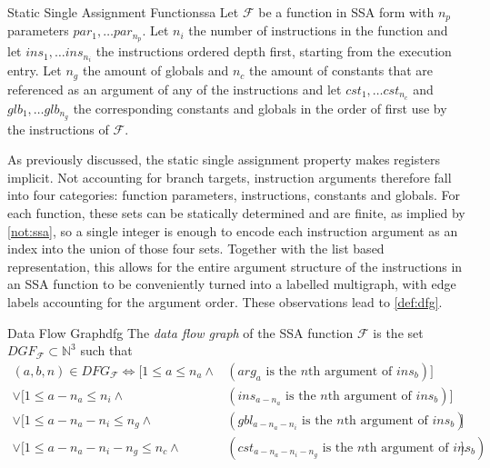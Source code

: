 \begin{notation}{Static Single Assignment Function}{ssa}
    Let $\mathcal F$ be a function in SSA form with $n_p$ parameters
    $par_1,\dots par_{n_p}$.
    Let $n_i$ the number of instructions in the function and let
    $ins_1,\dots ins_{n_i}$ the instructions ordered depth first, starting from
    the execution entry.
    Let $n_g$ the amount of globals and $n_c$ the amount of constants that are
    referenced as an argument of any of the instructions and let
    $cst_1,\dots cst_{n_c}$ and $glb_1,\dots glb_{n_g}$ the corresponding
    constants and globals in the order of first use by the instructions of
    $\mathcal F$.
\end{notation}

    As previously discussed, the static single assignment property makes
    registers implicit.
    Not accounting for branch targets, instruction arguments therefore fall into
    four categories: function parameters, instructions, constants and globals.
    For each function, these sets can be statically determined and are finite,
    as implied by \autoref{not:ssa}, so a single integer is enough to encode
    each instruction argument as an index into the union of those four sets.
    Together with the list based representation, this allows for the
    entire argument structure of the instructions in an SSA function to be
    conveniently turned into a labelled multigraph, with edge labels accounting
    for the argument order.
    These observations lead to \autoref{def:dfg}.

\begin{definition}{Data Flow Graph}{dfg}
    The {\em data flow graph} of the SSA function $\mathcal F$ is the set
    $DGF_{\mathcal F}\subset \mathbb N^3$ such that
    \begin{align*}
        (a,b,n)\in DFG_{\mathcal F}\iff[1\leq a\leq n_a\land&(arg_a\text{ is the $n$th argument of }ins_b)] \\
                                   \lor[1\leq a-n_a\leq n_i\land&(ins_{a-n_a}\text{ is the $n$th argument of }ins_b)] \\
                                   \lor[1\leq a-n_a-n_i\leq n_g\land&(gbl_{a-n_a-n_i}\text{ is the $n$th argument of }ins_b)] \\
                                   \lor[1\leq a-n_a-n_i-n_g\leq n_c\land&(cst_{a-n_a-n_i-n_g}\text{ is the $n$th argument of }ins_b)].
    \end{align*}
\end{definition}

